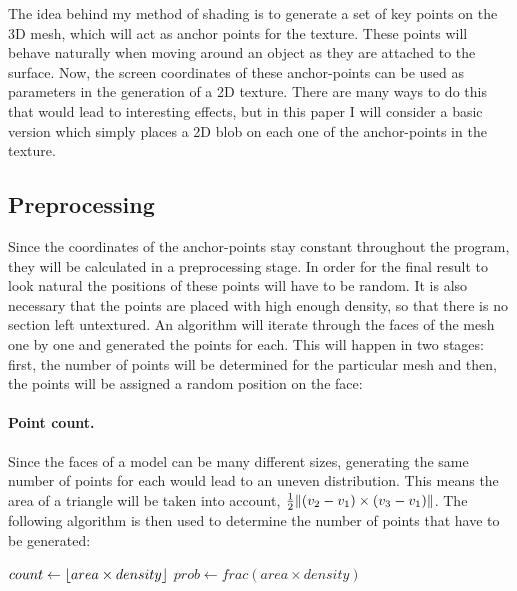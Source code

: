 \documentclass[a4paper, 12pt]{article}
\DeclarePairedDelimiter{\norm}{\lVert}{\rVert}
\DeclarePairedDelimiter{\floor}{\lfloor}{\rfloor}
\begin{document}
The idea behind my method of shading is to generate a set of key points on the 3D mesh, which will act as anchor points for the texture. These points will behave naturally when moving around an object as they are attached to the surface. Now, the screen coordinates of these anchor-points can be used as parameters in the generation of a 2D texture. There are many ways to do this that would lead to interesting effects, but in this paper I will consider a basic version which simply places a 2D blob on each one of the anchor-points in the texture.


\subsection{Preprocessing}

Since the coordinates of the anchor-points stay constant throughout the program, they will be calculated in a preprocessing stage. In order for the final result to look natural the positions of these points will have to be random. It is also necessary that the points are placed with high enough density, so that there is no section left untextured. An algorithm will iterate through the faces of the mesh one by one and generated the points for each. This will happen in two stages: first, the number of points will be determined for the particular mesh and then, the points will be assigned a random position on the face:

\paragraph{Point count.}
Since the faces of a model can be many different sizes, generating the same number of points for each would lead to an uneven distribution. This means the area of a triangle will be taken into account, $\frac{1}{2}\norm{(v_2-v_1) \times (v_3-v_1)}$. The following algorithm is then used to determine the number of points that have to be generated:

\begin{algorithm}[H]
$count \leftarrow \floor{area \times density}$\;
$prob \leftarrow frac(area \times density)$ 
\end{algorithm}
\end{document}
